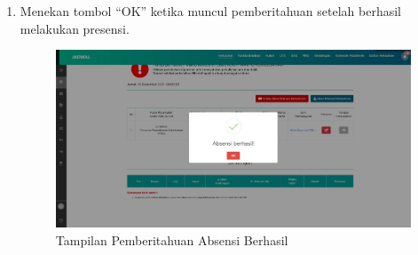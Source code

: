 \begin{enumerate}
	\item Menekan tombol ``OK'' ketika muncul pemberitahuan setelah berhasil melakukan presensi.
	\begin{figure}[H]
		\centering
		\includegraphics[scale=0.225]{Gambar/berhasilAbsen.jpg}
		\caption{Tampilan Pemberitahuan Absensi Berhasil} 
		\label{fig:berhasil}
	\end{figure}
\end{enumerate}


